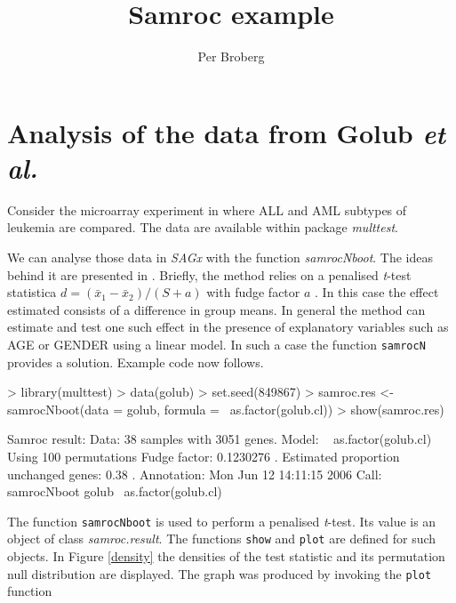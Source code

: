 \documentclass[11pt]{article}
\newcommand{\Rpackage}[1]{\textit{#1}}
\newcommand{\Rclass}[1]{\textit{#1}}
\newcommand{\Rfunction}[1]{{\small\texttt{#1}}}
\begin{document}
\title{Samroc example}
\author{Per Broberg}
\maketitle


\section*{Analysis of the data from Golub \textit{et al.}}

Consider the microarray experiment in \cite{golubetal} where ALL and AML subtypes of leukemia are compared.
The data are available within package \Rpackage{multtest}. 

We can analyse those data in \Rpackage{SAGx}  with the function \textit{samrocNboot}. The ideas behind
it are presented in \cite{broberg:2003}. Briefly, the method relies on a penalised \textit{t}-test statistica $ d = (\bar{x}_1 - \bar{x}_2)/(S + a)$ 
with fudge factor $a$ \cite{efron:2001}. In this case the effect estimated consists of a difference in group means. In general 
the method can estimate and test one such effect in the presence of explanatory variables such as AGE or GENDER using a linear model. In such a case
the function \Rfunction{samrocN} provides a solution. Example code now follows. 

\begin{Schunk}
\begin{Sinput}
> library(multtest)
> data(golub)
> set.seed(849867)
> samroc.res <- samrocNboot(data = golub, formula = ~as.factor(golub.cl))
> show(samroc.res)
\end{Sinput}
\begin{Soutput}
Samroc result:
Data: 38 samples with 3051 genes.
Model: ~ as.factor(golub.cl) 
Using 100 permutations
Fudge factor: 0.1230276 . Estimated proportion unchanged genes: 0.38 .
Annotation: Mon Jun 12 14:11:15 2006 
Call: samrocNboot golub ~as.factor(golub.cl) 
\end{Soutput}
\end{Schunk}
The function \Rfunction{samrocNboot} is used to perform a penalised \textit{t}-test. Its value is an object of class
\Rclass{samroc.result}. The functions \Rfunction{show} and \Rfunction{plot} are defined for such objects. In Figure \ref{density} the densities of the 
test statistic and its permutation null distribution are displayed. The graph was produced by invoking the \Rfunction{plot} function
\end{document}
